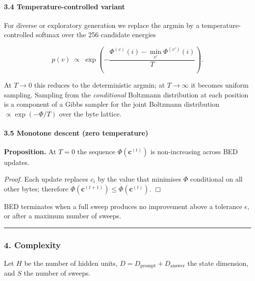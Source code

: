 \documentclass[
  11pt,
  a4paper,
]{article}
\begin{document}
\paragraph{3.4 Temperature-controlled
variant}\label{temperature-controlled-variant}

For diverse or exploratory generation we replace the argmin by a
temperature-controlled softmax over the 256 candidate energies

\[
p(v) \;\propto\; \exp\!\left( -\frac{\Phi^{(v)}(i) - \min_{v'} \Phi^{(v')}(i)}{T} \right).
\]

At \(T \to 0\) this reduces to the deterministic argmin; at
\(T \to \infty\) it becomes uniform sampling. Sampling from the
\emph{conditional} Boltzmann distribution at each position is a
component of a Gibbs sampler for the joint Boltzmann distribution
\(\propto \exp(-\Phi / T)\) over the byte lattice.

\paragraph{3.5 Monotone descent (zero
temperature)}\label{monotone-descent-zero-temperature}

\textbf{Proposition.} At \(T = 0\) the sequence
\(\Phi(\mathbf{c}^{(t)})\) is non-increasing across BED updates.

\emph{Proof.} Each update replaces \(c_i\) by the value that minimises
\(\Phi\) conditional on all other bytes; therefore
\(\Phi(\mathbf{c}^{(t+1)}) \le \Phi(\mathbf{c}^{(t)})\). \(\Box\)

BED terminates when a full sweep produces no improvement above a
tolerance \(\epsilon\), or after a maximum number of sweeps.

\begin{center}\rule{0.5\linewidth}{0.5pt}\end{center}

\subsubsection{4. Complexity}\label{complexity}

Let \(H\) be the number of hidden units,
\(D = D_{\text{prompt}} + D_{\text{answer}}\) the state dimension, and
\(S\) the number of sweeps.
\end{document}

